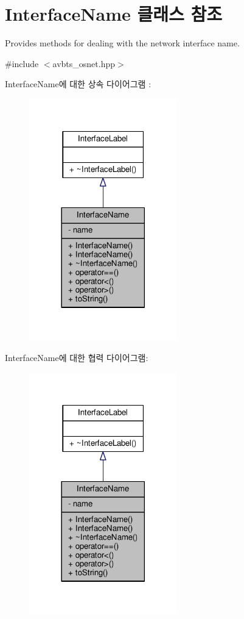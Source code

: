\hypertarget{class_interface_name}{}\section{Interface\+Name 클래스 참조}
\label{class_interface_name}


Provides methods for dealing with the network interface name.  




{\ttfamily \#include $<$avbts\+\_\+osnet.\+hpp$>$}



Interface\+Name에 대한 상속 다이어그램 \+: 
\nopagebreak
\begin{figure}[H]
\begin{center}
\leavevmode
\includegraphics[width=182pt]{class_interface_name__inherit__graph}
\end{center}
\end{figure}


Interface\+Name에 대한 협력 다이어그램\+:
\nopagebreak
\begin{figure}[H]
\begin{center}
\leavevmode
\includegraphics[width=182pt]{class_interface_name__coll__graph}
\end{center}
\end{figure}
